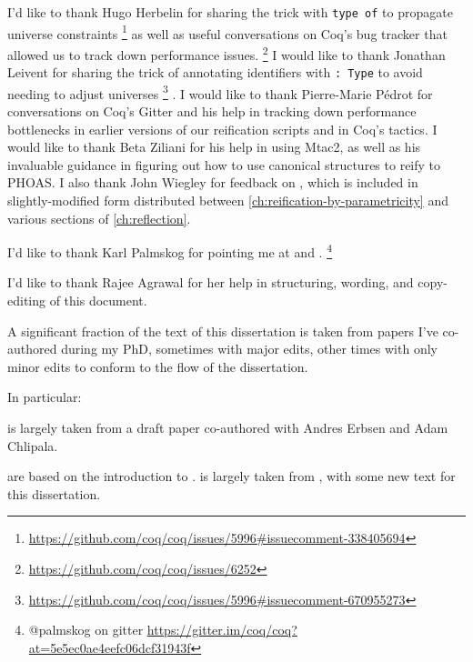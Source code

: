I'd like to thank Hugo Herbelin for sharing the trick with \texttt{type of} to propagate universe constraints%
\footnote{%
    \url{https://github.com/coq/coq/issues/5996\#issuecomment-338405694}%
}
as well as useful conversations on Coq's bug tracker that allowed us to track down performance issues.%
\footnote{%
    \url{https://github.com/coq/coq/issues/6252}%
}
I would like to thank Jonathan Leivent for sharing the trick of annotating identifiers with \texttt{: Type} to avoid needing to adjust universes%
\footnote{%
  \url{https://github.com/coq/coq/issues/5996\#issuecomment-670955273}
}%
.
I would like to thank Pierre-Marie Pédrot for conversations on Coq's Gitter and his help in tracking down performance bottlenecks in earlier versions of our reification scripts and in Coq's tactics.
I would like to thank Beta Ziliani for his help in using Mtac2, as well as his invaluable guidance in figuring out how to use canonical structures to reify to PHOAS.
I also thank John Wiegley for feedback on , which is included in slightly-modified form distributed between \autoref{ch:reification-by-parametricity} and various sections of \autoref{ch:reflection}.

I'd like to thank Karl Palmskog for pointing me at \textcite{Should1999Lamport} and \textcite{Formalising2018Paulson}.%
\footnote{@palmskog on gitter \url{https://gitter.im/coq/coq?at=5e5ec0ae4eefc06dcf31943f}}


I'd like to thank Rajee Agrawal for her help in structuring, wording, and copy-editing of this document.

A significant fraction of the text of this dissertation is taken from papers I've co-authored during my PhD, sometimes with major edits, other times with only minor edits to conform to the flow of the dissertation.

In particular:

 is largely taken from a draft paper co-authored with Andres Erbsen and Adam Chlipala.

 are based on the introduction to .
 is largely taken from , with some new text for this dissertation.

